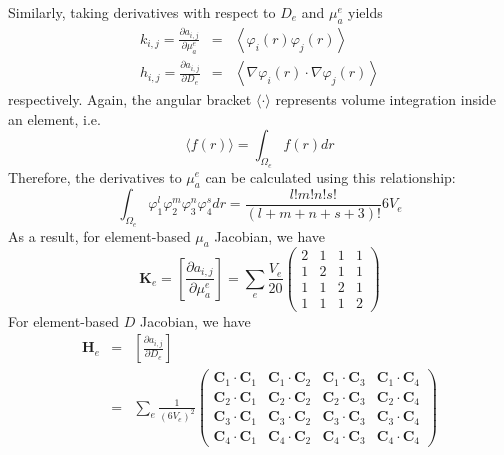\documentclass[12pt]{book}               %
\begin{document}
Similarly, taking derivatives with respect to $D_e$ and $\mu_a^{e}$ yields
\begin{eqnarray}
k_{i,j}=\frac{\partial
a_{i,j}}{\partial \mu_a^{e}}&=&\left\langle\varphi_i(r)\varphi_j(r)\right\rangle\\
h_{i,j}=\frac{\partial a_{i,j}}{\partial D_e}&=&\left\langle
\nabla\varphi_i(r)\cdot\nabla\varphi_j(r)\right\rangle
\end{eqnarray}
respectively. Again, the angular bracket $\langle\cdot\rangle$ represents volume integration inside
an element, i.e.
\begin{equation}
\langle f(r) \rangle=\int_{\Omega_e}f(r)dr
\end{equation}
Therefore, the derivatives to $\mu_a^e$ can be calculated using this relationship:
\begin{equation}
\int_{\Omega_e}\varphi_1^l\varphi_2^m\varphi_3^n\varphi_4^sdr=\frac{l!m!n!s!}{(l+m+n+s+3)!}6V_e
\end{equation}
As a result, for element-based $\mu_a$ Jacobian, we have
\begin{equation}
\mathbf{K}_e=\left[\frac{\partial a_{i,j}}{\partial \mu_a^{e}}\right]=\sum_e\frac{V_e}{20}\left(
\begin{array}{llll}
2 & 1 & 1 & 1 \\
1 & 2 & 1 & 1 \\
1 & 1 & 2 & 1 \\
1 & 1 & 1 & 2 
\end{array}
\right)
\end{equation}
For element-based $D$ Jacobian, we have
\begin{eqnarray}\nonumber
\mathbf{H}_e&=&\left[\frac{\partial
a_{i,j}}{\partial D_{e}}\right]\\&=&\sum_e\frac{1}{(6V_e)^2}\left(
\begin{array}{llll}
\mathbf{C}_1\cdot\mathbf{C}_1 & \mathbf{C}_1\cdot\mathbf{C}_2 & \mathbf{C}_1\cdot\mathbf{C}_3 & \mathbf{C}_1\cdot\mathbf{C}_4\\
\mathbf{C}_2\cdot\mathbf{C}_1 & \mathbf{C}_2\cdot\mathbf{C}_2 & \mathbf{C}_2\cdot\mathbf{C}_3 & \mathbf{C}_2\cdot\mathbf{C}_4\\
\mathbf{C}_3\cdot\mathbf{C}_1 & \mathbf{C}_3\cdot\mathbf{C}_2 & \mathbf{C}_3\cdot\mathbf{C}_3 & \mathbf{C}_3\cdot\mathbf{C}_4\\
\mathbf{C}_4\cdot\mathbf{C}_1 & \mathbf{C}_4\cdot\mathbf{C}_2 & \mathbf{C}_4\cdot\mathbf{C}_3 & \mathbf{C}_4\cdot\mathbf{C}_4
\end{array}
\right)
\end{eqnarray}
\end{document}
